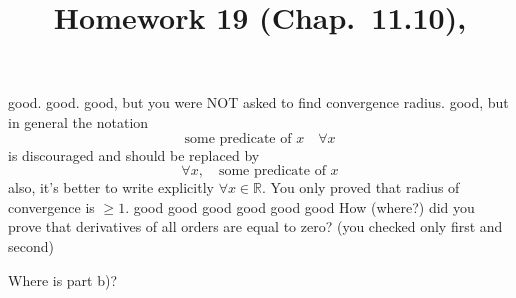 \documentclass[10pt]{article} %
\title{Homework 19 (Chap.~11.10),
}
\begin{document}
\maketitle
{}
good.
good.
good, but you were NOT asked to find convergence radius.
good, but in general the notation
\begin{equation*}
	\mbox{some predicate of $x$}\quad\forall x
\end{equation*}
is discouraged and should be replaced by
\begin{equation*}
 	\forall x,\quad
	\mbox{some predicate of $x$}
\end{equation*}
also, it's better to write explicitly $\forall x\in\mathbb{R}$.
You only proved that radius of convergence is $\ge1$.
good
good
good
good
good
good
How (where?) did you prove that derivatives of all orders are equal to zero? (you checked only first and second)

Where is part b)?
\end{document}
